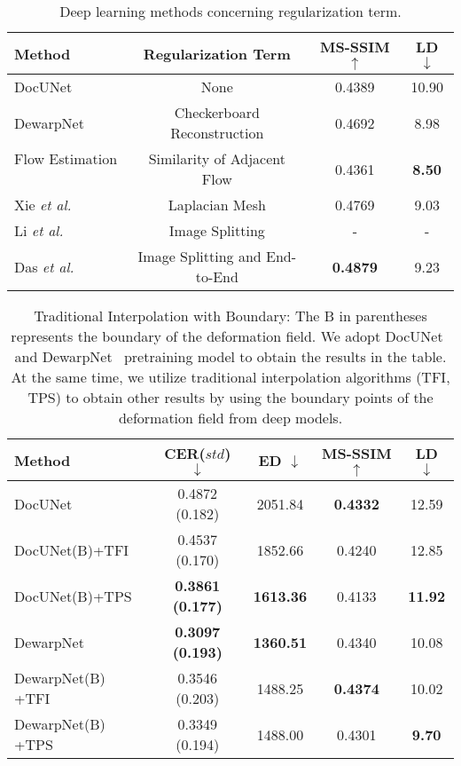 \documentclass[10pt,twocolumn,letterpaper]{article}
\begin{document}
\begin{table}[!t]
\scriptsize
  \centering
    \caption{Deep learning methods concerning regularization term.}
    \vspace{-3mm}
  \begin{tabular}{lccc}
    \toprule
    \textbf{Method} &  \textbf{Regularization Term}  & \textbf{MS-SSIM} $\uparrow$  & \textbf{LD} $\downarrow$\\
    \midrule
    DocUNet~\cite{Ma_2018_CVPR} & None   & 0.4389& 10.90\\
    DewarpNet~\cite{Das_2019_ICCV} & Checkerboard Reconstruction & 0.4692 & 8.98 \\
    Flow Estimation ~\cite{xie2020dewarping}&Similarity of Adjacent Flow & 0.4361&\textbf{8.50}\\
    Xie {\em et al.} ~\cite{xie2021document}& Laplacian Mesh & 0.4769&9.03\\
    Li {\em et al.} ~\cite{li2019document} & Image Splitting  &-  &-\\
    Das {\em et al.} ~\cite{das2021end} & Image Splitting and End-to-End& \textbf{0.4879}&9.23\\
    \bottomrule
  \end{tabular}
  \label{tab:Related method}
  \vspace{-1mm}
\end{table}


\begin{table}[!t]
\scriptsize
  \centering
    \caption{Traditional Interpolation with Boundary: The B in parentheses represents the boundary of the deformation field. We adopt DocUNet~\cite{Ma_2018_CVPR} and DewarpNet~\cite{Das_2019_ICCV} pretraining model to obtain the results in the table. At the same time, we utilize traditional interpolation algorithms (TFI, TPS) to obtain other results by using the boundary points of the deformation field from deep models.}
    \vspace{-3mm}
  \begin{tabular}{lcccc}
    \toprule
    \textbf{Method} &  \textbf{CER}($std$) $\downarrow$ & \textbf{ED} $\downarrow$ &\textbf{MS-SSIM} $\uparrow$ & \textbf{LD} $\downarrow$\\
    \midrule
    DocUNet~\cite{Ma_2018_CVPR} & 0.4872 (0.182) & 2051.84 & \textbf{0.4332} & 12.59	\\
    DocUNet(B)+TFI & 0.4537 (0.170) & 	1852.66 & 0.4240	& 12.85\\
    DocUNet(B)+TPS & \textbf{0.3861 (0.177)} & \textbf{1613.36} & 0.4133 & \textbf{11.92}  \\
    	
    \midrule
    DewarpNet~\cite{Das_2019_ICCV} & \textbf{0.3097 (0.193)} & \textbf{1360.51} & 0.4340	& 10.08	\\
    DewarpNet(B) +TFI & 0.3546 (0.203)	& 1488.25 & \textbf{0.4374} & 10.02	\\
    DewarpNet(B) +TPS &  0.3349 (0.194)	& 1488.00 & 0.4301 & \textbf{9.70} \\
    \bottomrule
  \end{tabular}
  \label{tab:bound}
  \vspace{2em}
\end{table}
\end{document}
